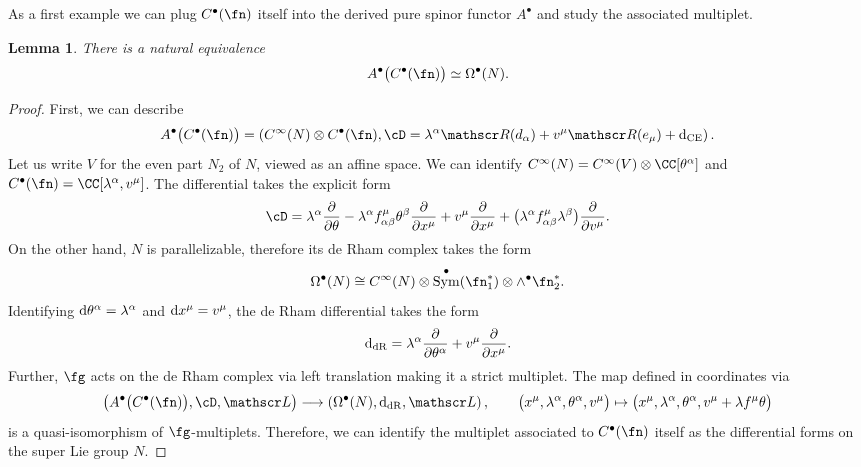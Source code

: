 \documentclass[10pt,a4paper]{amsart}
\numberwithin{equation}{section}
\newtheorem{lem}[thm]{Lemma}
\def\d{{\rm d}}
\DeclareMathOperator{\Sym}{Sym}
\def\sL{\mathscr L}
\def\sR{\mathscr R}
\begin{document}
As a first example we can plug $C^\bullet(\fn)$ itself into the derived pure spinor functor $A^\bullet$ and study the associated multiplet.

\begin{lem}
	There is a natural equivalence
	\begin{equation*}
	A^\bullet\big(C^\bullet(\fn)\big) \simeq \Omega^\bullet(N).
	\end{equation*}
	
\end{lem}

\begin{proof}
	First, we can describe
	\begin{equation*}
	A^\bullet\big(C^\bullet(\fn)\big) = \left( C^\infty(N) \otimes C^\bullet(\fn) , \cD = \lambda^\alpha \sR(d_\alpha) + v^\mu \sR(e_\mu) + \d_{\mathrm{CE}} \right) .
	\end{equation*}
	Let us write $V$ for the even part $N_2$ of $N$, viewed as an affine space. We can identify $C^\infty(N) = C^\infty(V) \otimes \CC[\theta^\alpha]$ and $C^\bullet(\fn) = \CC[\lambda^\alpha , v^\mu]$. The differential takes the explicit form
	\begin{equation*}
	\cD = \lambda^\alpha \frac{\partial}{\partial \theta} - \lambda^\alpha f^\mu_{\alpha \beta} \theta^\beta \frac{\partial}{\partial x^\mu} + v^\mu \frac{\partial}{\partial x^\mu} + \big(\lambda^\alpha f^\mu_{\alpha \beta} \lambda^\beta\big) \frac{\partial}{\partial v^\mu} .
	\end{equation*}
	On the other hand, $N$ is parallelizable, therefore its de Rham complex takes the form
	\begin{equation*}
	\Omega^\bullet(N) \cong C^\infty(N) \otimes \Sym^\bullet(\fn_1^*) \otimes \wedge^\bullet\fn_2^* .
	\end{equation*}
	Identifying $\d\theta^\alpha = \lambda^\alpha$ and $\d x^\mu = v^\mu$, the de Rham differential takes the form
	\begin{equation*}
	\d_{\mathrm{dR}} = \lambda^\alpha \frac{\partial}{\partial \theta^\alpha} + v^\mu \frac{\partial}{\partial x^\mu} .
	\end{equation*}
	Further, $\fg$ acts on the de Rham complex via left translation making it a strict multiplet. The map defined in coordinates via
	\begin{equation*}
	\big( A^\bullet\big(C^\bullet(\fn)\big) , \cD , \sL \big) \longrightarrow \left( \Omega^\bullet(N) , \d_{\mathrm{dR}} , \sL \right), \qquad \big(x^\mu, \lambda^\alpha, \theta^\alpha , v^\mu\big) \mapsto \big(x^\mu, \lambda^\alpha, \theta^\alpha, v^\mu + \lambda f^\mu \theta\big)
	\end{equation*}
	is a quasi-isomorphism of $\fg$-multiplets. Therefore, we can identify the multiplet associated to $C^\bullet(\fn)$ itself as the differential forms on the super Lie group $N$.
\end{proof}
\end{document}
